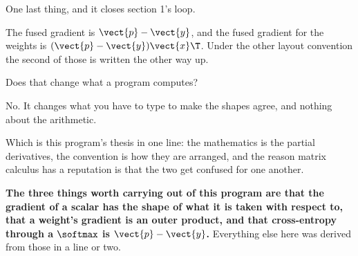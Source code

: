 \begin{fr}
One last thing, and it closes section 1's loop.

The fused gradient is $\vect{p} - \vect{y}$, and the fused gradient for the
weights is $(\vect{p} - \vect{y})\vect{x}\T$. Under the other layout
convention the second of those is written the other way up.

Does that change what a program computes?
\dotline
\nextframe
\end{fr}

\begin{fr}
\begin{ansblock}
No. It changes what you have to type to make the shapes agree, and nothing
about the arithmetic.
\end{ansblock}

Which is this program's thesis in one line: the mathematics is the partial
derivatives, the convention is how they are arranged, and the reason matrix
calculus has a reputation is that the two get confused for one another.

\textbf{The three things worth carrying out of this program are that the
gradient of a scalar has the shape of what it is taken with respect to, that
a weight's gradient is an outer product, and that cross-entropy through a
$\softmax$ is $\vect{p} - \vect{y}$.} Everything else here was derived from
those in a line or two.
\end{fr}

